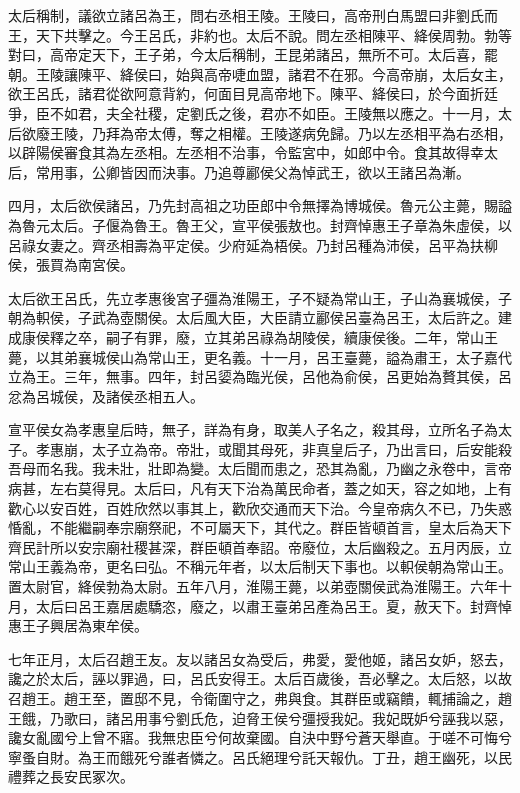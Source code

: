 太后稱制，議欲立諸呂為王，問右丞相王陵。王陵曰，高帝刑白馬盟曰非劉氏而王，天下共擊之。今王呂氏，非約也。太后不說。問左丞相陳平、絳侯周勃。勃等對曰，高帝定天下，王子弟，今太后稱制，王昆弟諸呂，無所不可。太后喜，罷朝。王陵讓陳平、絳侯曰，始與高帝啑血盟，諸君不在邪。今高帝崩，太后女主，欲王呂氏，諸君從欲阿意背約，何面目見高帝地下。陳平、絳侯曰，於今面折廷爭，臣不如君，夫全社稷，定劉氏之後，君亦不如臣。王陵無以應之。十一月，太后欲廢王陵，乃拜為帝太傅，奪之相權。王陵遂病免歸。乃以左丞相平為右丞相，以辟陽侯審食其為左丞相。左丞相不治事，令監宮中，如郎中令。食其故得幸太后，常用事，公卿皆因而決事。乃追尊酈侯父為悼武王，欲以王諸呂為漸。

四月，太后欲侯諸呂，乃先封高祖之功臣郎中令無擇為博城侯。魯元公主薨，賜謚為魯元太后。子偃為魯王。魯王父，宣平侯張敖也。封齊悼惠王子章為朱虛侯，以呂祿女妻之。齊丞相壽為平定侯。少府延為梧侯。乃封呂種為沛侯，呂平為扶柳侯，張買為南宮侯。

太后欲王呂氏，先立孝惠後宮子彊為淮陽王，子不疑為常山王，子山為襄城侯，子朝為軹侯，子武為壺關侯。太后風大臣，大臣請立酈侯呂臺為呂王，太后許之。建成康侯釋之卒，嗣子有罪，廢，立其弟呂祿為胡陵侯，續康侯後。二年，常山王薨，以其弟襄城侯山為常山王，更名義。十一月，呂王臺薨，謚為肅王，太子嘉代立為王。三年，無事。四年，封呂媭為臨光侯，呂他為俞侯，呂更始為贅其侯，呂忿為呂城侯，及諸侯丞相五人。

宣平侯女為孝惠皇后時，無子，詳為有身，取美人子名之，殺其母，立所名子為太子。孝惠崩，太子立為帝。帝壯，或聞其母死，非真皇后子，乃出言曰，后安能殺吾母而名我。我未壯，壯即為變。太后聞而患之，恐其為亂，乃幽之永卷中，言帝病甚，左右莫得見。太后曰，凡有天下治為萬民命者，蓋之如天，容之如地，上有歡心以安百姓，百姓欣然以事其上，歡欣交通而天下治。今皇帝病久不已，乃失惑惛亂，不能繼嗣奉宗廟祭祀，不可屬天下，其代之。群臣皆頓首言，皇太后為天下齊民計所以安宗廟社稷甚深，群臣頓首奉詔。帝廢位，太后幽殺之。五月丙辰，立常山王義為帝，更名曰弘。不稱元年者，以太后制天下事也。以軹侯朝為常山王。置太尉官，絳侯勃為太尉。五年八月，淮陽王薨，以弟壺關侯武為淮陽王。六年十月，太后曰呂王嘉居處驕恣，廢之，以肅王臺弟呂產為呂王。夏，赦天下。封齊悼惠王子興居為東牟侯。

七年正月，太后召趙王友。友以諸呂女為受后，弗愛，愛他姬，諸呂女妒，怒去，讒之於太后，誣以罪過，曰，呂氏安得王。太后百歲後，吾必擊之。太后怒，以故召趙王。趙王至，置邸不見，令衛圍守之，弗與食。其群臣或竊饋，輒捕論之，趙王餓，乃歌曰，諸呂用事兮劉氏危，迫脅王侯兮彊授我妃。我妃既妒兮誣我以惡，讒女亂國兮上曾不寤。我無忠臣兮何故棄國。自決中野兮蒼天舉直。于嗟不可悔兮寧蚤自財。為王而餓死兮誰者憐之。呂氏絕理兮託天報仇。丁丑，趙王幽死，以民禮葬之長安民冢次。

